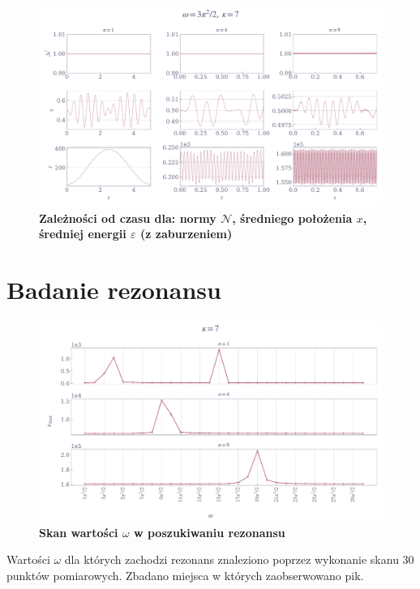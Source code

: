 \documentclass[11pt,a4paper]{article}
\begin{document}
\begin{figure}[ht!]
    \caption{\textbf{Zależności od czasu dla: normy $\mathcal{N}$, średniego położenia $x$, średniej energii $\varepsilon$ (z zaburzeniem)}}
    \vspace{0.2cm}
    \includegraphics[width=\linewidth]{../figures/fluctuations.pdf}
\end{figure}
\pagebreak

\section{Badanie rezonansu}

\begin{figure}[ht!]
    \caption{\textbf{Skan wartości $\omega$ w poszukiwaniu rezonansu}}
    \vspace{0.2cm}
    \includegraphics[width=\linewidth]{../figures/resonance.pdf}
\end{figure}

Wartości $\omega$ dla których zachodzi rezonans znaleziono poprzez wykonanie skanu 30 punktów pomiarowych. Zbadano miejsca w których zaobserwowano pik.
\pagebreak
\end{document}
